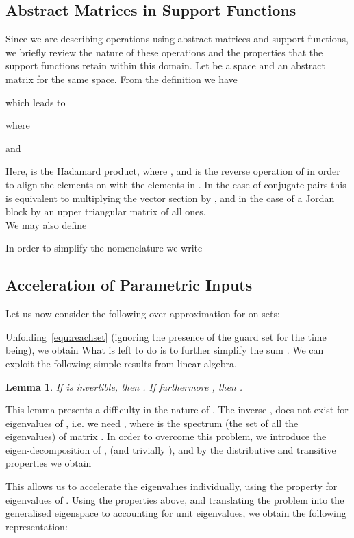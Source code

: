 \documentclass{IEEEtran}
\newtheorem{lemma}{Lemma}
\begin{document}
\subsection{Abstract Matrices in Support Functions}\label{sec:absmatinsupfunc}


Since we are describing operations using abstract matrices and support
functions, we briefly review the nature of these operations and
the properties that the support functions retain within this domain.  Let  be a space and 
an abstract matrix for the same space.  From the definition we have

which leads to 

where

and

Here,  is the Hadamard product, where , and  is the reverse operation of  in order to align the elements on  with the elements in . In the case of conjugate pairs this is equivalent to multiplying the vector section by , and in the case of a Jordan block by an upper triangular matrix of all ones.\\

We may also define

In order to simplify the nomenclature we write


\subsection{Acceleration of Parametric Inputs}


Let us now consider the following over-approximation for  on sets:

Unfolding~\eqref{equ:reachset} (ignoring the presence of the guard set  for the time being), we obtain 
What is left to do is to further simplify the sum .
We can exploit the following simple results from linear algebra. 
\begin{lemma}
\label{eq::accel}
If  is invertible, then 
.  
If furthermore , then 
. 
\end{lemma}

This lemma presents a difficulty in the nature of . The inverse ,
does not exist for eigenvalues of , i.e. we need , 
where  is the spectrum (the set of all the eigenvalues) of matrix .
In order to overcome this problem, we introduce the eigen-decomposition of , 
(and trivially ), and by the distributive and transitive properties we obtain 

This allows us to accelerate the eigenvalues individually, using the property  for eigenvalues of .
Using the properties above, and translating the problem into the generalised eigenspace to accounting for
unit eigenvalues, we obtain the following representation:
\end{document}
